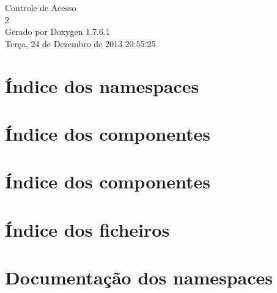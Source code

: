 \documentclass[a4paper]{book}
\begin{document}
\hypersetup{pageanchor=false,citecolor=blue}
\begin{titlepage}
\vspace*{7cm}
\begin{center}
{\Large \-Controle de \-Acesso \\[1ex]\large 2 }\\
\vspace*{1cm}
{\large \-Gerado por Doxygen 1.7.6.1}\\
\vspace*{0.5cm}
{\small Terça, 24 de Dezembro de 2013 20:55:25}\\
\end{center}
\end{titlepage}
\clearemptydoublepage
{}
\tableofcontents
\clearemptydoublepage
{}
\hypersetup{pageanchor=true,citecolor=blue}
\chapter{Índice dos namespaces}

\chapter{Índice dos componentes}

\chapter{Índice dos componentes}

\chapter{Índice dos ficheiros}

\chapter{\-Documentação dos namespaces}














\end{document}
